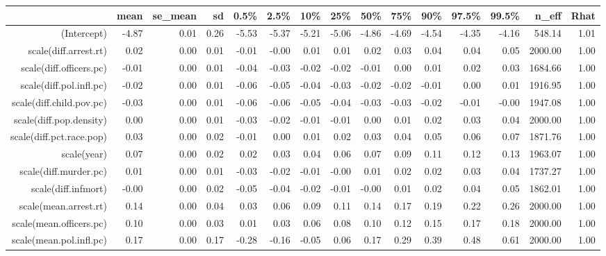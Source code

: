\begin{table}[ht]
\centering
\begin{tabular}{rrrrrrrrrrrrrrr}
  \hline
 & mean & se\_mean & sd & 0.5\% & 2.5\% & 10\% & 25\% & 50\% & 75\% & 90\% & 97.5\% & 99.5\% & n\_eff & Rhat \\ 
  \hline
(Intercept) & -4.87 & 0.01 & 0.26 & -5.53 & -5.37 & -5.21 & -5.06 & -4.86 & -4.69 & -4.54 & -4.35 & -4.16 & 548.14 & 1.01 \\ 
  scale(diff.arrest.rt) & 0.02 & 0.00 & 0.01 & -0.01 & -0.00 & 0.01 & 0.01 & 0.02 & 0.03 & 0.04 & 0.04 & 0.05 & 2000.00 & 1.00 \\ 
  scale(diff.officers.pc) & -0.01 & 0.00 & 0.01 & -0.04 & -0.03 & -0.02 & -0.02 & -0.01 & 0.00 & 0.01 & 0.02 & 0.03 & 1684.66 & 1.00 \\ 
  scale(diff.pol.infl.pc) & -0.02 & 0.00 & 0.01 & -0.06 & -0.05 & -0.04 & -0.03 & -0.02 & -0.02 & -0.01 & 0.00 & 0.01 & 1916.95 & 1.00 \\ 
  scale(diff.child.pov.pc) & -0.03 & 0.00 & 0.01 & -0.06 & -0.06 & -0.05 & -0.04 & -0.03 & -0.03 & -0.02 & -0.01 & -0.00 & 1947.08 & 1.00 \\ 
  scale(diff.pop.density) & 0.00 & 0.00 & 0.01 & -0.03 & -0.02 & -0.01 & -0.01 & 0.00 & 0.01 & 0.02 & 0.03 & 0.04 & 2000.00 & 1.00 \\ 
  scale(diff.pct.race.pop) & 0.03 & 0.00 & 0.02 & -0.01 & 0.00 & 0.01 & 0.02 & 0.03 & 0.04 & 0.05 & 0.06 & 0.07 & 1871.76 & 1.00 \\ 
  scale(year) & 0.07 & 0.00 & 0.02 & 0.02 & 0.03 & 0.04 & 0.06 & 0.07 & 0.09 & 0.11 & 0.12 & 0.13 & 1963.07 & 1.00 \\ 
  scale(diff.murder.pc) & 0.01 & 0.00 & 0.01 & -0.03 & -0.02 & -0.01 & -0.00 & 0.01 & 0.02 & 0.02 & 0.03 & 0.04 & 1737.27 & 1.00 \\ 
  scale(diff.infmort) & -0.00 & 0.00 & 0.02 & -0.05 & -0.04 & -0.02 & -0.01 & -0.00 & 0.01 & 0.02 & 0.04 & 0.05 & 1862.01 & 1.00 \\ 
  scale(mean.arrest.rt) & 0.14 & 0.00 & 0.04 & 0.03 & 0.06 & 0.09 & 0.11 & 0.14 & 0.17 & 0.19 & 0.22 & 0.26 & 2000.00 & 1.00 \\ 
  scale(mean.officers.pc) & 0.10 & 0.00 & 0.03 & 0.01 & 0.03 & 0.06 & 0.08 & 0.10 & 0.12 & 0.15 & 0.17 & 0.18 & 2000.00 & 1.00 \\ 
  scale(mean.pol.infl.pc) & 0.17 & 0.00 & 0.17 & -0.28 & -0.16 & -0.05 & 0.06 & 0.17 & 0.29 & 0.39 & 0.48 & 0.61 & 2000.00 & 1.00 \\ 

\end{tabular}
\end{table}
